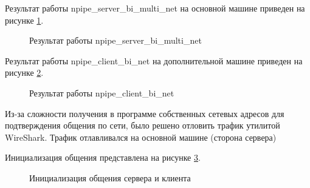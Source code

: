 \documentclass[a4paper]{article}
\begin{document}
	Результат работы npipe\_server\_bi\_multi\_net на основной машине приведен на рисунке \ref{img:task5m}.
	\begin{figure}[h!]
		\caption{Результат работы npipe\_server\_bi\_multi\_net}
		\label{img:task5m}
	\end{figure}
	
	Результат работы npipe\_client\_bi\_net на дополнительной машине приведен на рисунке \ref{img:task5s}.
	\begin{figure}[h!]
		\caption{Результат работы npipe\_client\_bi\_net}
		\label{img:task5s}
	\end{figure}		
	
	Из-за сложности получения в программе собственных сетевых адресов для подтверждения общения по сети, было решено отловить трафик утилитой WireShark. Трафик отлавливался на основной машине (сторона сервера)
	
		Инициализация общения представлена на рисунке \ref{img:wireinit}.
	\begin{figure}[h!]
		\caption{Инициализация общения сервера и клиента}
		\label{img:wireinit}
	\end{figure}
	
\end{document}
